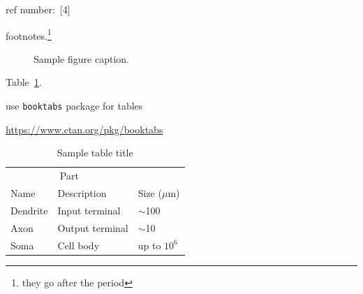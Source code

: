 \documentclass{article}
\begin{document}
ref number:\ [4]

footnotes.\footnote{they go after the period}

\begin{figure}[h]
  \centering
  \fbox{\rule[-.5cm]{0cm}{4cm} \rule[-.5cm]{4cm}{0cm}}
  \caption{Sample figure caption.}
\end{figure}

Table~\ref{sample-table}.

use \verb+booktabs+ package for tables
\begin{center}
  \url{https://www.ctan.org/pkg/booktabs}
\end{center}

\begin{table}[t]
  \caption{Sample table title}
  \label{sample-table}
  \centering
  \begin{tabular}{lll}
    \toprule
    \multicolumn{2}{c}{Part}                   \\
    \cmidrule{1-2}
    Name     & Description     & Size ($\mu$m) \\
    \midrule
    Dendrite & Input terminal  & $\sim$100     \\
    Axon     & Output terminal & $\sim$10      \\
    Soma     & Cell body       & up to $10^6$  \\
    \bottomrule
  \end{tabular}
\end{table}
\end{document}
